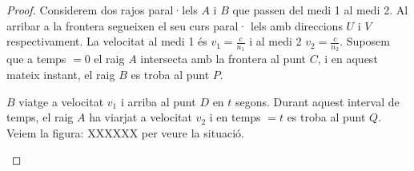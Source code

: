 \documentclass{article}
\begin{document}
\begin{proof}
   Considerem dos rajos paral·lels $A$ i $B$ que passen del medi 1 al medi 2. Al arribar a la frontera segueixen el seu curs
   paral· lels amb direccions $U$ i  $V$ respectivament. La velocitat al medi 1 és $v_1=\frac{c}{n_1}$ i al medi 2 $v_2=\frac{c}{n_2}$.
   Suposem que a temps  $=0$ el raig  $A$ intersecta amb la frontera al punt  $C$, i en aquest mateix instant, el raig  $B$ es
   troba al punt  $P$.

   $B$ viatge a velocitat  $v_1$ i arriba al punt $D$ en  $t$ segons. Durant aquest interval de temps, el raig $A$ ha viarjat a
   velocitat  $v_2$ i en temps $=t$ es troba al punt  $Q$.
   Veiem la figura: XXXXXX per veure la situació.
   \begin{figure}[h]
      \centering
{} %

\begin{tikzpicture}[x=0.75pt,y=0.75pt,yscale=-1,xscale=1]


\end{tikzpicture}
\end{figure}
\end{proof}
\end{document}
